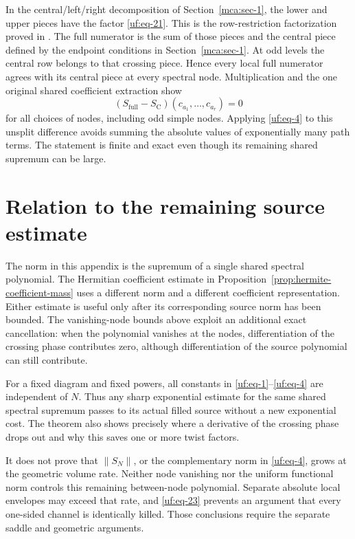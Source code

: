 In the central/left/right decomposition of
Section~\ref{mca:sec-1}, the lower and upper pieces have the factor
\eqref{uf:eq-21}. This is the row-restriction factorization proved in
\cite[Section 2]{CasimirSources}.
The full numerator is the sum of those pieces and the central
piece defined by the endpoint conditions in Section~\ref{mca:sec-1}. At odd levels the
central row belongs to that crossing piece. Hence every local full
numerator agrees with its central piece at every spectral node. Multiplication and
the one original shared coefficient extraction show \begin{equation}\label{uf:eq-25}
(S_{\mathrm{full}}-S_{\mathrm C})
                    (c_{a_1},\ldots,c_{a_r})=0
\end{equation} for all choices of nodes, including odd simple nodes. Applying \eqref{uf:eq-4} to
this unsplit difference avoids summing the absolute values of
exponentially many path terms. The statement is finite and exact even
though its remaining shared supremum can be large.

\section{Relation to the remaining source estimate}\label{uf:sec-what-the-norm-theorem-does-and-does-not-supply}

The norm in this appendix is the supremum of a single shared
spectral polynomial. The Hermitian coefficient estimate in
Proposition~\ref{prop:hermite-coefficient-mass} uses a different norm
and a different coefficient representation. Either estimate is useful
only after its corresponding source norm has been bounded. The
vanishing-node bounds above exploit an additional exact cancellation:
when the polynomial vanishes at the nodes, differentiation of the
crossing phase contributes zero, although differentiation of the source
polynomial can still contribute.

For a fixed diagram and fixed powers, all constants in \eqref{uf:eq-1}--\eqref{uf:eq-4} are
independent of \(N\). Thus any sharp exponential estimate for the same
shared spectral supremum passes to its actual filled source without a
new exponential cost. The theorem also shows precisely where a
derivative of the crossing phase drops out and why this saves one or
more twist factors.

It does not prove that \(\|S_N\|\), or the complementary norm in \eqref{uf:eq-4},
grows at the geometric volume rate. Neither node vanishing nor the
uniform functional norm controls this remaining between-node polynomial.
Separate absolute local envelopes may exceed that rate, and \eqref{uf:eq-23}
prevents an argument that every one-sided channel is identically killed.
Those conclusions require the separate saddle and geometric arguments.


